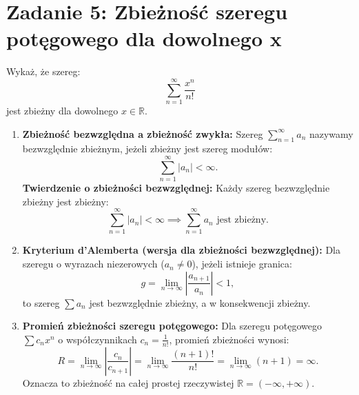 \section{Zadanie 5: Zbieżność szeregu potęgowego dla dowolnego x}
\label{sec:zadanie5}

\begin{tresczadania}
Wykaż, że szereg:
\begin{equation*}
    \sum_{n=1}^{\infty} \frac{x^n}{n!}
\end{equation*}
jest zbieżny dla dowolnego $x \in \mathbb{R}$.
\end{tresczadania}

\vspace{0.2cm}

\begin{teoriabox}
\begin{enumerate}
    \item \textbf{Zbieżność bezwzględna a zbieżność zwykła:}
    Szereg $\sum_{n=1}^{\infty} a_n$ nazywamy bezwzględnie zbieżnym, jeżeli zbieżny jest szereg modułów:
    \begin{equation}
        \sum_{n=1}^{\infty} |a_n| < \infty.
        \label{eq:abs_conv_def}
    \end{equation}
    \textbf{Twierdzenie o zbieżności bezwzględnej:} Każdy szereg bezwzględnie zbieżny jest zbieżny:
    \begin{equation*}
        \sum_{n=1}^{\infty} |a_n| < \infty \implies \sum_{n=1}^{\infty} a_n \text{ jest zbieżny}.
    \end{equation*}

    \item \textbf{Kryterium d'Alemberta (wersja dla zbieżności bezwzględnej):}
    Dla szeregu o wyrazach niezerowych ($a_n \neq 0$), jeżeli istnieje granica:
    \begin{equation}
        g = \lim_{n \to \infty} \left| \frac{a_{n+1}}{a_n} \right| < 1,
        \label{eq:dalembert_modul}
    \end{equation}
    to szereg $\sum a_n$ jest bezwzględnie zbieżny, a w konsekwencji zbieżny.

    \item \textbf{Promień zbieżności szeregu potęgowego:}
    Dla szeregu potęgowego $\sum c_n x^n$ o współczynnikach $c_n = \frac{1}{n!}$, promień zbieżności wynosi:
    \begin{equation*}
        R = \lim_{n \to \infty} \left|\frac{c_n}{c_{n+1}}\right| = \lim_{n \to \infty} \frac{(n+1)!}{n!} = \lim_{n \to \infty} (n+1) = \infty.
    \end{equation*}
    Oznacza to zbieżność na całej prostej rzeczywistej $\mathbb{R} = (-\infty, +\infty)$.
\end{enumerate}
\end{teoriabox}

